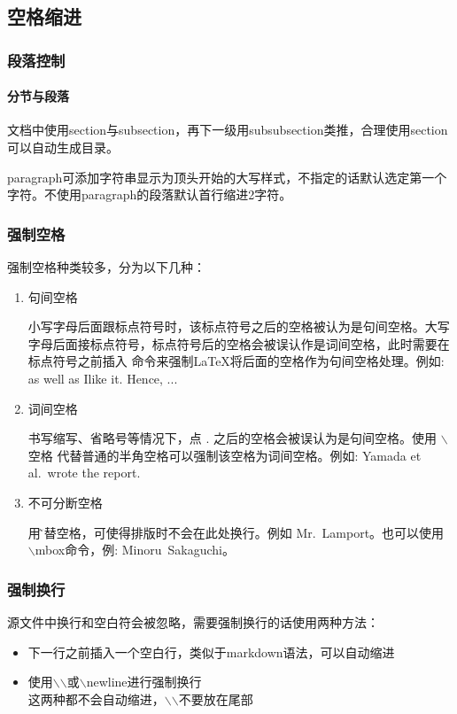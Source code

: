 \documentclass[a4paper,10 pt, conference]{article}     %
\begin{document}
    \subsection{空格缩进}
    \subsubsection{段落控制}
    \paragraph{分节与段落}  文档中使用section与subsection，再下一级用subsubsection类推，合理使用section可以自动生成目录。

    paragraph可添加字符串显示为顶头开始的大写样式，不指定的话默认选定第一个字符。不使用paragraph的段落默认首行缩进2字符。

    \subsubsection{强制空格}
    强制空格种类较多，分为以下几种：

    \begin{enumerate}
    \item 句间空格

    小写字母后面跟标点符号时，该标点符号之后的空格被认为是句间空格。大写字母后面接标点符号，标点符号后的空格会被误认作是词间空格，此时需要在标点符号之前插入 \@ 命令来强制LaTeX将后面的空格作为句间空格处理。例如: as well as I\@ like it. Hence, ...

    \item 词间空格

    书写缩写、省略号等情况下，点 . 之后的空格会被误认为是句间空格。使用 $\backslash$空格 代替普通的半角空格可以强制该空格为词间空格。例如: Yamada et al.\ wrote the report.

    \item 不可分断空格

    用\~代替空格，可使得排版时不会在此处换行。例如 Mr.~Lamport。也可以使用 $\backslash$mbox命令，例: \mbox{Minoru Sakaguchi}。
    \end{enumerate}

    \subsubsection{强制换行}
    源文件中换行和空白符会被忽略，需要强制换行的话使用两种方法：
    \begin{itemize}
    \item 下一行之前插入一个空白行，类似于markdown语法，可以自动缩进
    \item 使用$\backslash$$\backslash$或$\backslash$newline进行强制换行  \hfill \\ 这两种都不会自动缩进，$\backslash$$\backslash$不要放在尾部
    \end{itemize}
\end{document}
